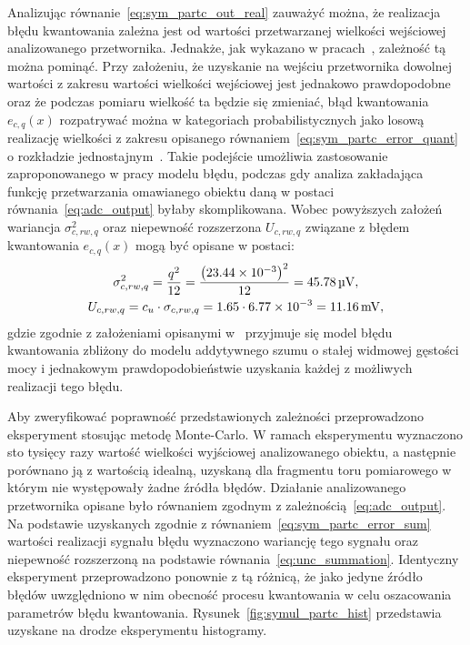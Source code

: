 Analizując równanie~\eqref{eq:sym_partc_out_real} zauważyć można, że realizacja błędu kwantowania zależna jest od wartości przetwarzanej wielkości wejściowej analizowanego przetwornika. Jednakże, jak wykazano w pracach~\cite{sienkowski_kwant, sienkowski_adc}, zależność tą można pominąć. Przy założeniu, że uzyskanie na wejściu przetwornika dowolnej wartości z zakresu wartości wielkości wejściowej jest jednakowo prawdopodobne oraz że podczas pomiaru wielkość ta będzie się zmieniać, błąd kwantowania $e_{c,q}(x)$ rozpatrywać można w kategoriach probabilistycznych jako losową realizację wielkości z zakresu opisanego równaniem~\eqref{eq:sym_partc_error_quant} o rozkładzie jednostajnym~\cite{jakubiec_system}. Takie podejście umożliwia zastosowanie zaproponowanego w pracy modelu błędu, podczas gdy analiza zakładająca funkcję przetwarzania omawianego obiektu daną w postaci równania~\eqref{eq:adc_output} byłaby skomplikowana. Wobec powyższych założeń wariancja $\sigma_{c,rw,q}^{2}$ oraz niepewność rozszerzona $U_{c,rw,q}$ związane z błędem kwantowania $e_{c,q}(x)$ mogą być opisane w postaci:
\begin{gather}
\sigma_{c,rw,q}^{2} = \frac{ q^{2}}{12} = \frac{\left(\num{23.44e-3}\right)^{2} }{12} = \qty{45.78}{\micro V} \label{eq:sym_partc_var_quant}, \\
U_{c,rw,q} = c_{u} \cdot \sigma_{c,rw,q} = 1.65 \cdot \num{6.77e-3} = \qty{11.16}{mV} \label{eq:sym_partc_uncert_quant},
\end{gather}
gdzie zgodnie z założeniami opisanymi w~\cite{gray_quantization, widrow_quantization} przyjmuje się model błędu kwantowania zbliżony do modelu addytywnego szumu o stałej widmowej gęstości mocy i jednakowym prawdopodobieństwie uzyskania każdej z możliwych realizacji tego błędu.

Aby zweryfikować poprawność przedstawionych zależności przeprowadzono eksperyment stosując metodę Monte-Carlo. W ramach eksperymentu wyznaczono sto tysięcy razy wartość wielkości wyjściowej analizowanego obiektu, a następnie porównano ją z wartością idealną, uzyskaną dla fragmentu toru pomiarowego w którym nie występowały żadne źródła błędów. Działanie analizowanego przetwornika opisane było równaniem zgodnym z zależnością~\eqref{eq:adc_output}. Na podstawie uzyskanych zgodnie z równaniem~\eqref{eq:sym_partc_error_sum} wartości realizacji sygnału błędu wyznaczono wariancję tego sygnału oraz niepewność rozszerzoną na podstawie równania~\eqref{eq:unc_summation}. Identyczny eksperyment przeprowadzono ponownie z tą różnicą, że jako jedyne źródło błędów uwzględniono w nim obecność procesu kwantowania w celu oszacowania parametrów błędu kwantowania. Rysunek~\ref{fig:symul_partc_hist} przedstawia uzyskane na drodze eksperymentu histogramy.

